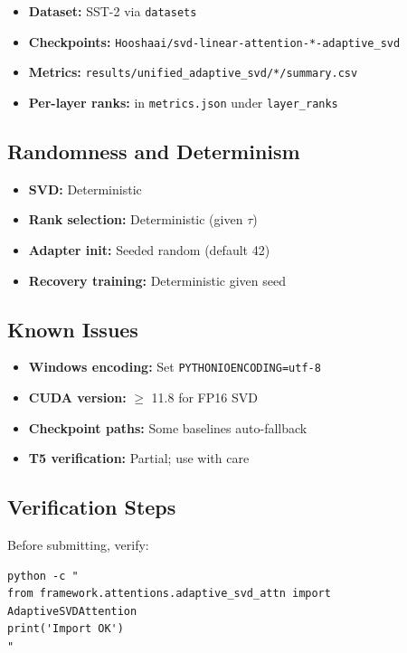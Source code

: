 \begin{itemize}
\item \textbf{Dataset:} SST-2 via \texttt{datasets}
\item \textbf{Checkpoints:} \texttt{Hooshaai/svd-linear-attention-*-adaptive\_svd}
\item \textbf{Metrics:} \texttt{results/unified\_adaptive\_svd/*/summary.csv}
\item \textbf{Per-layer ranks:} in \texttt{metrics.json} under \texttt{layer\_ranks}

\end{itemize}
\subsection{Randomness and Determinism}

\begin{itemize}
\item \textbf{SVD:} Deterministic
\item \textbf{Rank selection:} Deterministic (given $\tau$)
\item \textbf{Adapter init:} Seeded random (default 42)
\item \textbf{Recovery training:} Deterministic given seed

\end{itemize}
\subsection{Known Issues}

\begin{itemize}
\item \textbf{Windows encoding:} Set \texttt{PYTHONIOENCODING=utf-8}
\item \textbf{CUDA version:} $\ge$ 11.8 for FP16 SVD
\item \textbf{Checkpoint paths:} Some baselines auto-fallback
\item \textbf{T5 verification:} Partial; use with care

\end{itemize}
\subsection{Verification Steps}

Before submitting, verify:

\begin{lstlisting}
python -c "
from framework.attentions.adaptive_svd_attn import AdaptiveSVDAttention
print('Import OK')
"
\end{lstlisting}

